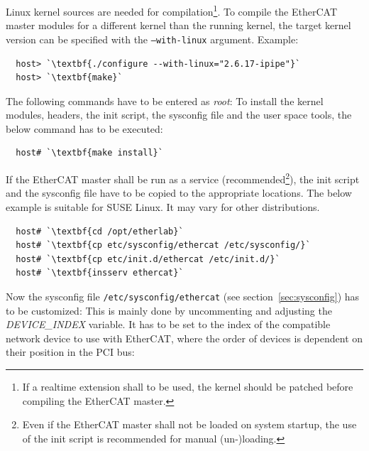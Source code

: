 \documentclass[a4paper,12pt,BCOR6mm,bibtotoc,idxtotoc]{scrbook}
\begin{document}
Linux kernel sources are needed for compilation\footnote{If a realtime
  extension shall to be used, the kernel should be patched before
  compiling the EtherCAT master.}. To compile the EtherCAT master
modules for a different kernel than the running kernel, the target
kernel version can be specified with the \texttt{--with-linux}
argument. Example:

\begin{lstlisting}
  host> `\textbf{./configure --with-linux="2.6.17-ipipe"}`
  host> `\textbf{make}`
\end{lstlisting}

The following commands have to be entered as \textit{root}: To install
the kernel modules, headers, the init script, the sysconfig file and
the user space tools, the below command has to be executed:

\begin{lstlisting}
  host# `\textbf{make install}`
\end{lstlisting}

If the EtherCAT master shall be run as a service
(recommended\footnote{Even if the EtherCAT master shall not be loaded
  on system startup, the use of the init script is recommended for
  manual (un-)loading.}), the init script and the sysconfig file have
to be copied to the appropriate locations. The below example is
suitable for SUSE Linux.  It may vary for other distributions.

\begin{lstlisting}
  host# `\textbf{cd /opt/etherlab}`
  host# `\textbf{cp etc/sysconfig/ethercat /etc/sysconfig/}`
  host# `\textbf{cp etc/init.d/ethercat /etc/init.d/}`
  host# `\textbf{insserv ethercat}`
\end{lstlisting}

Now the sysconfig file \texttt{/etc/sysconfig/ethercat} (see
section~\ref{sec:sysconfig}) has to be customized: This is mainly done
by uncommenting and adjusting the \textit{DEVICE\_INDEX} variable. It
has to be set to the index of the compatible network device to use
with EtherCAT, where the order of devices is dependent on their
position in the PCI bus:
\end{document}
